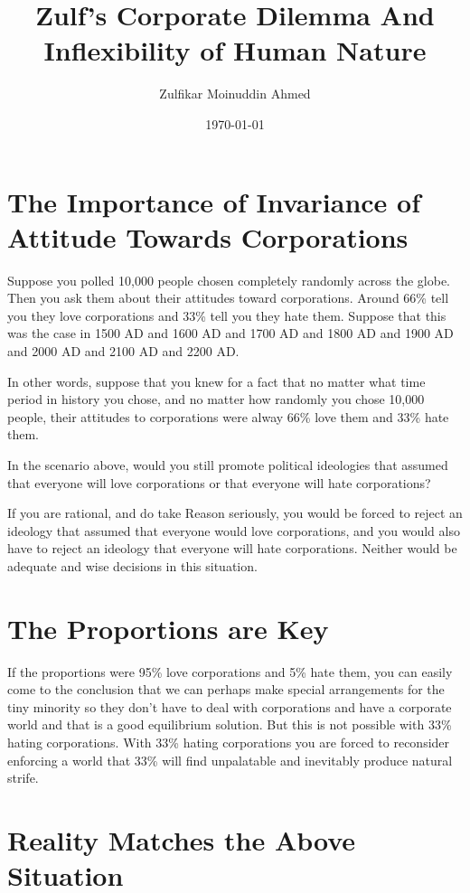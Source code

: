 \documentclass{amsart}
\title{Zulf's Corporate Dilemma And Inflexibility of Human Nature}
\author{Zulfikar Moinuddin Ahmed}
\date{\today}
\begin{document}
\maketitle

\section{The Importance of Invariance of Attitude Towards Corporations}

Suppose you polled 10,000 people chosen completely randomly across the globe.  Then you ask them about their attitudes toward corporations.  Around 66\% tell you they love corporations and 33\% tell you they hate them.  Suppose that this was the case in 1500 AD and 1600 AD and 1700 AD and 1800 AD and 1900 AD and 2000 AD and 2100 AD and 2200 AD.  

In other words, suppose that you knew for a fact that no matter what time period in history you chose, and no matter how randomly you chose 10,000 people, their attitudes to corporations were alway 66\% 
love them and 33\% hate them.

In the scenario above, would you still promote political ideologies that assumed that everyone will love corporations or that everyone will hate corporations?

If you are rational, and do take Reason seriously, you would be forced to reject an ideology that assumed that everyone would love corporations, and you would also have to reject an ideology that everyone will hate corporations.  Neither would be adequate and wise decisions in this situation.

\section{The Proportions are Key}

If the proportions were 95\% love corporations and 5\% hate them, you can easily come to the conclusion that we can perhaps make special arrangements for the tiny minority so they don't have to deal with corporations and have a corporate world and that is a good equilibrium solution.  But this is not possible with 33\% hating corporations.  With 33\% hating corporations you are forced to reconsider enforcing a world that 33\% will find unpalatable and inevitably produce natural strife.


\section{Reality Matches the Above Situation}
\end{document}
